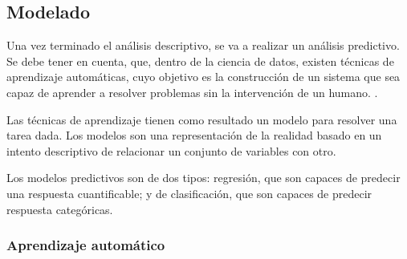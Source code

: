 

\subsection{Modelado}
Una vez terminado el análisis descriptivo, se va a realizar un análisis predictivo. Se debe tener en cuenta, que, dentro de la ciencia de datos, existen técnicas de aprendizaje automáticas, cuyo objetivo es la construcción de un sistema que sea capaz de aprender a resolver problemas sin la intervención de un humano. \cite{MARIN2018}.

Las técnicas de aprendizaje tienen como resultado un modelo para resolver una tarea dada. Los modelos son una representación de la realidad basado en un intento descriptivo de relacionar un conjunto de variables con otro.

Los modelos predictivos son de dos tipos: regresión, que son capaces de predecir una respuesta cuantificable; y de clasificación, que son capaces de predecir respuesta categóricas.

\subsubsection{Aprendizaje automático}

